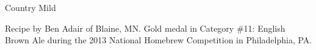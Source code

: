 \documentclass[parskip=half,fontsize=9pt,oneside]{scrbook}
\begin{document}
\mainmatter


\begin{recipe}{Country Mild}

\begin{aboutblock}
Recipe by Ben Adair of Blaine, MN. Gold medal in Category \#11: English Brown Ale
during the 2013 National Homebrew Competition in Philadelphia, PA.
\sourceaha
\end{aboutblock}


\begin{methodandtiming}

\begin{mashsteps}
\end{mashsteps}

\begin{fermentationsteps}
\end{fermentationsteps}

\end{methodandtiming}

\recipebreak

\begin{ingredientsblock}

\begin{malts}

\end{malts}

\begin{hops}
\end{hops}


\end{ingredientsblock}

\end{recipe}


\end{document}
